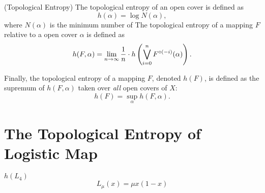 \documentclass[12pt,twoside,draft]{book}
\begin{document}
\begin{definition}
  (Topological Entropy)
  The topological entropy of an open cover is defined as
  \begin{equation*}
    h(\alpha) = \log N(\alpha),
  \end{equation*}
  where $N(\alpha)$ is the minimum number of 
  The topological entropy of a mapping $F$ relative to a open cover $\alpha$ is defined as
  \begin{equation*}
    h(F,\alpha) = \lim\limits_{n \to \infty} \frac{1}{n} \cdot h\left (  \bigvee\limits_{i=0}^n F^{\circ (-i)}(\alpha)  \right ).
  \end{equation*}
  
  Finally, the topological entropy of a mapping $F$, denoted $h(F)$, is defined as the supremum of $h(F, \alpha)$ taken over \textit{all} open covers of $X$:
  \begin{equation*}
    h(F) = \sup\limits_\alpha h(F,\alpha).
  \end{equation*}
  \label{defn:t-entropy}
\end{definition}

\section{The Topological Entropy of Logistic Map}
$h(L_4)$
\begin{equation*}
  L_\mu(x) = \mu x (1-x)
\end{equation*}





\printindex
\end{document}
